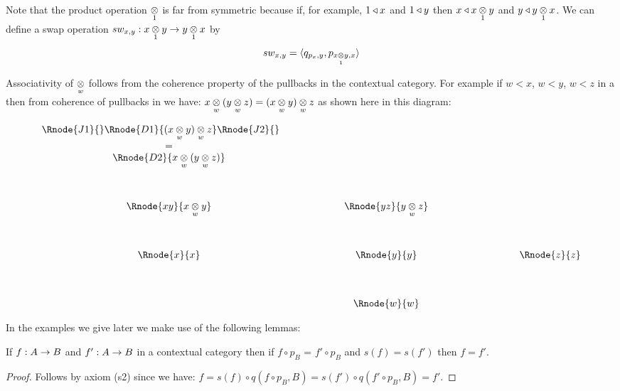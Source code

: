 \note 
Note that the product operation $\crossx{}{}{1}$ is far from symmetric 
because if, for example, $1 \base x$ and $1 \base y$ then $x \base \crossx{x}{y}{1}$ and $y \base \crossx{y}{x}{1}$. We can define 
a swap operation $sw_{x,y} : \crossx{x}{y}{1} \morph \crossx{y}{x}{1}$ by
\begin{equation}
sw_{x,y} = \tuple{q_{p_x,y}, p_{\crossx{x}{y}{1},x}}
\end{equation}

\note
Associativity of $\crossx{}{}w$  follows from the coherence property of the pullbacks in the contextual category. 
For example if $w < x$, $w < y$, $w < z$ in a \ccat then from coherence of pullbacks in \ccat we have:
$\crossx{x}{(\crossx{y}{z}{w})}{w} = \crossx{(\crossx{x}{y}{w})}{z}{w}$ as shown here in this diagram:
 
\begin{displaymath}
\begin{array}{cp{1.0cm}cp{1.0cm}c}
\Rnode{J1}{}\Rnode{D1} {\crossx{(\crossx{x}{y}{w})}{z}{w}}\Rnode{J2}{} \ \ \ \ \   &&  &&  \\ 
= && && \\
\Rnode{D2} {\crossx{x}{(\crossx{y}{z}{w})}{w}}    &&  &&                        \\ [1.3cm]
\Rnode{xy}{\crossx{x}{y}{w}}&& \Rnode{yz}{\crossx{y}{z}{w}} &&                      \\[1.3cm]
\Rnode{x}{x}&& \Rnode{y}{y} && \ \ \ \ \ \ \ \ \ \ \ \ \ \Rnode{z}{z}                                        \\[1.3cm]
             && \Rnode{w}{w} &&                                                     
\end{array}
\end{displaymath}




\note In the examples we give later we make use of the following lemmas:

\begin{lemma}
If $f: A \morph B$ and $f':A \morph B$ in a contextual category \catcw then if 
$f \circ p_B$ = $f' \circ p_B$ and $s(f) = s(f')$ then $f=f'$.
\end{lemma}
\begin{proof}
Follows by axiom (s2) since we have:
$f = s(f) \circ q(f \circ p_B,B)  = s(f') \circ q(f' \circ p_B,B) = f'$.
\end{proof}

